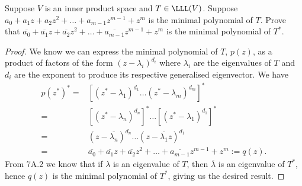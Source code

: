 \begin{exercise}{16}
  Suppose $V$ is an inner product space and $T\in\LLL(V)$. Suppose $a_0+a_1z+a_2z^2+\dots+a_{m-1}z^{m-1}+z^m$ is the minimal polynomial of $T$. Prove that $\overline{a_0}+\overline{a_1}z+\overline{a_2}z^2+\dots+\overline{a_{m-1}}z^{m-1}+z^m$ is the minimal polynomial of $T^\ast$.
\end{exercise}
\begin{proof}
 We know we can express the minimal polynomial of $T$, $p(z)$, as a product of factors of the form $(z-\lambda_i)^{d_i}$ where $\lambda_i$ are the eigenvalues of $T$ and $d_i$ are the exponent to produce its respective generalised eigenvector. We have 
 \begin{align*}
     p(z^\ast)^\ast =& [(z^\ast-\lambda_1)^{d_1}\dots(z^\ast-\lambda_m)^{d_m}]^\ast\\ 
     =& [(z^\ast-\lambda_n)^{d_n}]^\ast\dots[(z^\ast-\lambda_1)^{d_1}]^\ast\\ 
     =& (z-\overline{\lambda_n})^{d_n}\dots(z-\overline{\lambda_1} z)^{d_1}\\
     =& \overline{a_0}+\overline{a_1}z+\overline{a_2}z^2+\dots+\overline{a_{m-1}}z^{m-1}+z^m :=q(z). 
 \end{align*}
 From 7A.2 we know that if $\lambda$ is an eigenvalue of $T$, then $\overline{\lambda}$ is an eigenvalue of $T^\ast$, hence $q(z)$ is the minimal polynomial of $T^\ast$, giving us the desired result.
\end{proof}